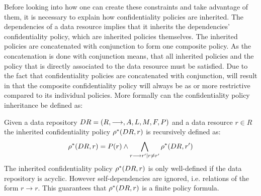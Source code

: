Before looking into how one can create these constraints and take advantage of them, it is necessary to explain how confidentiality policies are inherited. The dependencies of a data resource implies that it inherits the dependencies' confidentiality policy, which are inherited policies themselves. The inherited policies are concatenated with conjunction to form one composite policy. As the concatenation is done with conjunction means, that all inherited policies and the policy that is directly associated to the data resource must be satisfied. Due to the fact that confidentiality policies are concatenated with conjunction, will result in that the composite confidentiality policy will always be as or more restrictive compared to its individual policies. More formally can the confidentiality policy inheritance be defined as:
\begin{definition}\label{def:cpi}
Given a data repository $DR= \left( R, \longrightarrow, A, L, M, F, P \right)$ and a data resource $r \in R$ the inherited confidentiality policy $\rho^{\ast}(DR, r)$ is recursively defined as:
\begin{equation*}
    \rho^{\ast}(DR, r) = P(r) \land \bigwedge\limits_{r \longrightarrow r' \mid r \neq r'} \rho^{\ast}(DR, r')
\end{equation*}
The inherited confidentiality policy $\rho^{\ast}(DR, r)$ is only well-defined if the data repository is acyclic. However self-dependencies are ignored, i.e. relations of the form $r \longrightarrow r$. This guarantees that $\rho^{\ast}(DR, r)$ is a finite policy formula.
\end{definition}

